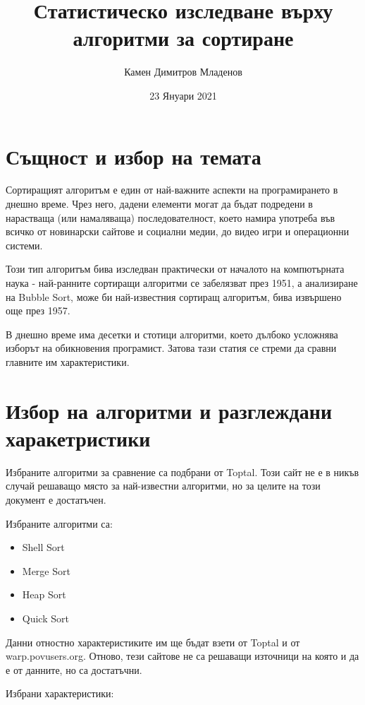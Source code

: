\documentclass[12pt,a4paper]{article}
\title{Статистическо изследване върху алгоритми за сортиране}
\author{Камен Димитров Младенов}
\date{23 Януари 2021}
\begin{document}
\maketitle
\tableofcontents

\newpage

\section{Същност и избор на темата}

Сортиращият алгоритъм е един от най-важните аспекти на програмирането в днешно време. 
Чрез него, дадени елементи могат да бъдат подредени в нарастваща (или намаляваща) последователност, което намира употреба във всичко от новинарски сайтове и социални медии, до видео игри и операционни системи.

Този тип алгоритъм бива изследван практически от началото на компютърната наука - най-ранните сортиращи алгоритми се забелязват през 1951, а анализиране на Bubble Sort, може би най-известния сортиращ алгоритъм, бива извършено още през 1957.\cite{wikipedia_sorting_algorithm_history}

В днешно време има десетки и стотици алгоритми, което дълбоко усложнява изборът на обикновения програмист. 
Затова тази статия се стреми да сравни главните им характеристики.

\section{Избор на алгоритми и разглеждани харакетристики}

Избраните алгоритми за сравнение са подбрани от Toptal\cite{toptal}. Този сайт не е в никъв случай решаващо място за най-известни алгоритми, но за целите на този документ е достатъчен. 

Избраните алгоритми са:

\begin{itemize}
\item Shell Sort
\item Merge Sort
\item Heap Sort
\item Quick Sort
\end{itemize}

Данни отностно характеристиките им ще бъдат взети от Toptal\cite{toptal} и от warp.povusers.org\cite{comparing_algorithms}. Отново, тези сайтове не са решаващи източници на която и да е от данните, но са достатъчни. 

Избрани характеристики:
\end{document}
